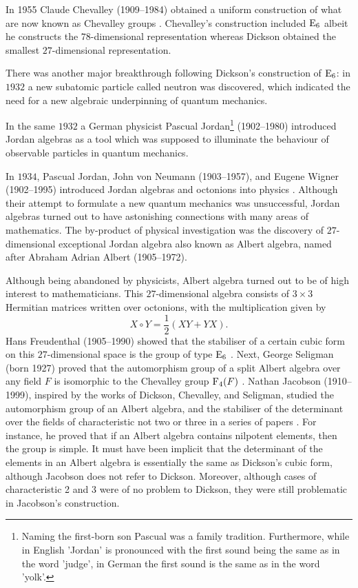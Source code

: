In 1955 Claude Chevalley (1909--1984) obtained a uniform
construction of what are now known as Chevalley groups 
\cite{Chevalley}. Chevalley's construction included $\mathrm{E}_6$ albeit
he constructs the $78$-dimensional representation whereas
Dickson obtained the smallest $27$-dimensional representation. 

There was another major breakthrough following Dickson's 
construction of $\mathrm{E}_6$: in $1932$ a new subatomic particle called
neutron was discovered, which indicated the need for a new 
algebraic underpinning of quantum mechanics.

In the same $1932$ a German physicist 
Pascual Jordan\footnote{
Naming the first-born son Pascual was a family tradition. 
Furthermore, while in English 'Jordan' is pronounced with the
first sound being the same as in the word 'judge', in German
the first sound is the same as in the word 'yolk'.
} (1902--1980) introduced Jordan algebras as a tool which was 
supposed to illuminate the behaviour of observable particles 
in quantum mechanics. 

In $1934$, Pascual Jordan, John von Neumann (1903--1957), 
and Eugene Wigner (1902--1995) introduced Jordan 
algebras and octonions into physics \cite{JordanNeumannWigner}. 
Although their attempt to formulate a new quantum mechanics was
unsuccessful, Jordan algebras turned out to have astonishing 
connections with many areas of mathematics. The by-product of
physical investigation was the discovery of $27$-dimensional
exceptional Jordan algebra also known as Albert algebra, named 
after Abraham Adrian Albert (1905--1972).

Although being abandoned by physicists, Albert algebra turned out
to be of high interest to mathematicians. This $27$-dimensional
algebra consists of $3\times 3$ Hermitian matrices written 
over octonions, with the multiplication given by
\begin{equation}
X\circ Y = \frac12 (XY + YX).	
\end{equation}
Hans Freudenthal (1905--1990) showed that the stabiliser
of a certain cubic form on this $27$-dimensional space is the 
group of type $\mathrm{E}_6$ \cite{Freudenthal}. Next, 
George Seligman (born 1927) proved that the 
automorphism group of a split Albert algebra over any field
$F$ is isomorphic to the Chevalley group $\mathrm{F}_4(F)$ 
\cite{Seligman}. Nathan Jacobson (1910--1999), 
inspired by the works of Dickson,
Chevalley, and Seligman, studied the automorphism group of an
Albert algebra, and the stabiliser of the determinant over the
fields of characteristic not two or three in a series of papers
\cite{JacobsonOne,JacobsonTwo,JacobsonThree}. For instance, he 
proved that if an Albert algebra contains nilpotent elements, 
then the group is simple. It must have been implicit that the
determinant of the elements in an Albert algebra is essentially
the same as Dickson's cubic form, although Jacobson does not refer
to Dickson. Moreover, although cases of characteristic 2 and 3
were of no problem to Dickson, they were still problematic in
Jacobson's construction.

